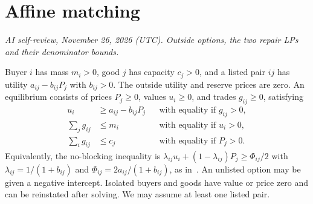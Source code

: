 \documentclass[11pt,oneside,openany,notitlepage]{report}
\newcommand{\reviewdate}{November 26, 2026 (UTC)}
\newcommand{\reviewmark}[1]{\par\nopagebreak[4]\noindent
  {\footnotesize\itshape AI self-review, \reviewdate. #1\par}\nobreak\smallskip}
\begin{document}
\section{Affine matching}
\reviewmark{Outside options, the two repair LPs and their denominator bounds.}
Buyer \(i\) has mass \(m_i>0\), good \(j\) has capacity \(c_j>0\), and
a listed pair \(ij\) has utility \(a_{ij}-b_{ij}P_j\) with \(b_{ij}>0\).
The outside utility and reserve prices are zero. An equilibrium consists of
prices \(P_j\ge0\), values \(u_i\ge0\), and trades \(g_{ij}\ge0\), satisfying
\begin{align}
 u_i&\ge a_{ij}-b_{ij}P_j
       &&\text{with equality if }g_{ij}>0,\nonumber\\
 \sum_jg_{ij}&\le m_i &&\text{with equality if }u_i>0,\label{eq:m1}\\
 \sum_i g_{ij}&\le c_j &&\text{with equality if }P_j>0.\nonumber
\end{align}
Equivalently, the no-blocking inequality is
\(\lambda_{ij}u_i+(1-\lambda_{ij})P_j\ge\Phi_{ij}/2\) with
\(\lambda_{ij}=1/(1+b_{ij})\) and \(\Phi_{ij}=2a_{ij}/(1+b_{ij})\),
as in~\cite{gj,book}. An unlisted option may be given a negative intercept.
Isolated buyers and goods have value or price zero and can be reinstated
after solving. We may assume at least one listed pair.
\end{document}
